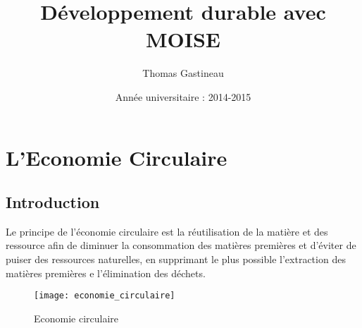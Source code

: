 \documentclass[a4paper,11pt]{report}
\title{Développement durable avec MOISE}
\date{Année universitaire :  2014-2015}
\author{Thomas Gastineau}
\begin{document}
\maketitle  %
\newpage  %

 \setcounter{page}{1} %


\newpage
\null
\thispagestyle{empty}
\newpage

{\tableofcontents} 
\listoffigures


\newpage

\chapter*{L'Economie Circulaire}
\section*{Introduction}
 \setcounter{page}{1} %

Le principe de l'économie circulaire est la réutilisation de la matière et des ressource afin de diminuer la consommation des matières premières et d'éviter de puiser des ressources naturelles, en supprimant le plus possible l'extraction des matières premières e l'élimination des déchets.
\begin{figure}[!h]
\begin{center}
\texttt{[image: economie\_circulaire]} 
\caption{\label{donkey}Economie circulaire}
\end{center}
\end{figure}

 


\end{document}
